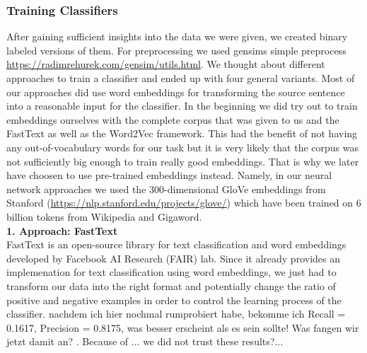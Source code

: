 \subsubsection{Training Classifiers}
After gaining sufficient insights into the data we were given, we created binary labeled versions of them. For preprocessing we used gensims simple preprocess \lbrack\url{https://radimrehurek.com/gensim/utils.html}\rbrack . We thought about different approaches to train a classifier and ended up with four general variants. Most of our approaches did use word embeddings for transforming the source sentence into a reasonable input for the classifier. In the beginning we did try out to train embeddings ourselves with the complete corpus that was given to us and the FastText as well as the Word2Vec framework. This had the benefit of not having any out-of-vocabulary words for our task but it is very likely that the corpus was not sufficiently big enough to train really good embeddings. That is why we later have choosen to use pre-trained embeddings instead. Namely, in our neural network approaches we used the $300$-dimensional GloVe embeddings from Stanford (\url{https://nlp.stanford.edu/projects/glove/}) which have been trained on 6 billion tokens from Wikipedia and Gigaword. \\

\textbf{1. Approach: FastText}\\
FastText \cite{joulin2016bag} is an open-source library for text classification and word embeddings developed by Facebook AI Research (FAIR) lab. Since it already provides an implemenation for text classification using word embeddings, we just had to transform our data into the right format and potentially change the ratio of positive and negative examples in order to control the learning process of the classifier. \lbrack nachdem ich hier nochmal rumprobiert habe, bekomme ich Recall = 0.1617, Precision = 0.8175, was besser erscheint als es sein sollte! Was fangen wir jetzt damit an? \rbrack. Because of ... we did not trust these results?... \\

